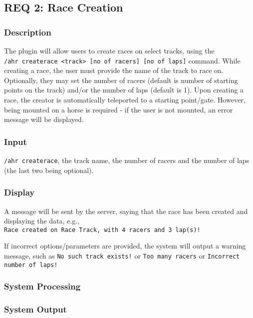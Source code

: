 \documentclass[a4paper, 11pt]{article} %
\begin{document}
\newpage

\subsection{REQ 2: Race Creation}

\subsubsection{Description}

The plugin will allow users to create races on select tracks, using the \\\verb;/ahr createrace <track> [no of racers] [no of laps]; command. While creating a race, the user must provide the name of the track to race on. Optionally, they may set the number of racers (default is number of starting points on the track) and/or the number of laps (default is 1). Upon creating a race, the creator is automatically teleported to a starting point/gate. However, being mounted on a horse is required - if the user is not mounted, an error message will be displayed.

\subsubsection{Input}

\verb;/ahr createrace;, the track name, the number of racers and the number of laps (the last two being optional).

\subsubsection{Display}

A message will be sent by the server, saying that the race has been created and displaying the data, e.g.,\\ \verb;Race created on Race Track, with 4 racers and 3 lap(s)!;

If incorrect options/parameters are provided, the system will output a warning message, such as \verb;No such track exists!; or \verb;Too many racers; or \verb;Incorrect number of laps!;

\subsubsection{System Processing}

\subsubsection{System Output}
\end{document}
